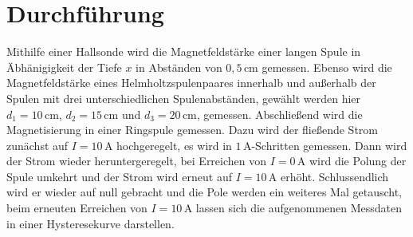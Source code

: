 \section{Durchführung}
\label{sec:Durchführung}
Mithilfe einer Hallsonde wird die Magnetfeldstärke einer langen Spule in Äbhänigigkeit der Tiefe $x$ in Abständen von $0,5\, \unit{\centi\meter}$ gemessen.
Ebenso wird die Magnetfeldstärke eines Helmholtzspulenpaares innerhalb und außerhalb der Spulen mit drei unterschiedlichen Spulenabständen, gewählt werden hier $d_1=10 \, \unit{\centi\meter}$, $d_2= 15\, \unit{\centi\meter}$ und
$d_3 = 20\, \unit{\centi\meter}$, gemessen.
Abschließend wird die Magnetisierung in einer Ringspule gemessen. Dazu wird der fließende Strom zunächst  auf $I = 10 \, \unit{\ampere}$ hochgeregelt, es wird in $1 \, \unit{\ampere}$-Schritten gemessen. Dann wird der Strom wieder 
heruntergeregelt, bei Erreichen von $I= 0 \, \unit{\ampere}$ wird die Polung der Spule umkehrt und der Strom wird erneut auf $I = 10 \, \unit{\ampere}$ erhöht. Schlussendlich wird er wieder auf null gebracht und die Pole werden ein weiteres Mal getauscht,
beim erneuten Erreichen von $I = 10 \, \unit{\ampere}$ lassen sich die aufgenommenen Messdaten in einer Hysteresekurve darstellen.
